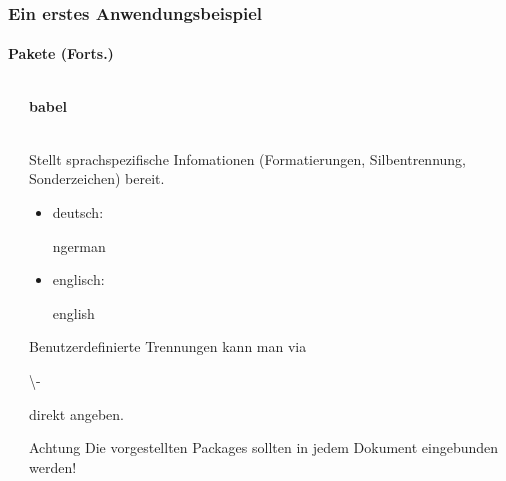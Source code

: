 
\begin{frame}
\frametitle{Ein erstes Anwendungsbeispiel}
\framesubtitle{Pakete (Forts.)}
\begin{columns}
\begin{column}{0.55\textwidth}
\begin{ttfamily}\footnotesize

 \normalsize
\end{ttfamily}
\end{column}
\begin{column}{0.45\textwidth}
\begin{ttfamily}\textbf{babel}\end{ttfamily}\\
Stellt sprachspezifische Infomationen (Formatierungen, Silbentrennung, Sonderzeichen) bereit.\\
\begin{itemize}
\item deutsch: \begin{ttfamily}ngerman\end{ttfamily}
\item englisch: \begin{ttfamily}english\end{ttfamily}
\end{itemize}
Benutzerdefinierte Trennungen kann man via {\begin{ttfamily} \color{unibaredI}\textbackslash - \end{ttfamily}} direkt angeben.\\

\begin{alertblock}{Achtung}
Die vorgestellten Packages sollten in jedem Dokument eingebunden werden!
\end{alertblock}
\end{column}
\end{columns}
\end{frame}





